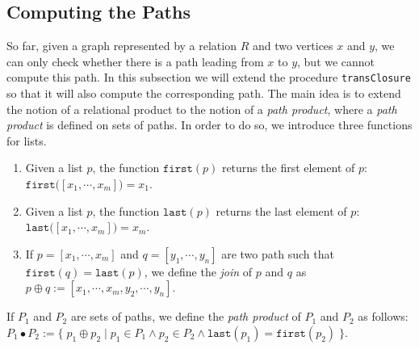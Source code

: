 \subsection{Computing the Paths}
So far, given a graph represented by a relation $R$ and two vertices $x$ and $y$, we can only check
whether there is a path leading from $x$ to $y$, but we cannot compute this path.  In this
subsection we will extend the procedure \texttt{transClosure} so that it will also compute the
corresponding path.  The main idea is to extend the notion of a relational product to the notion of
a \emph{path product}, where a \emph{path product} is defined on sets of paths.  In order to do so,
we introduce three functions for lists.
\begin{enumerate}
\item Given a list $p$, the function $\texttt{first}(p)$ returns the first element of $p$: 
      \\[0.2cm]
      \hspace*{1.3cm}
      $\texttt{first}\bigl([x_1,\cdots,x_m]\bigr) = x_1$.
\item Given a list $p$, the function $\texttt{last}(p)$ returns the last element of $p$: 
      \\[0.2cm]
      \hspace*{1.3cm}
      $\texttt{last}\bigl([x_1,\cdots,x_m]\bigl) = x_m$.
\item If $p = [ x_1, \cdots, x_m ]$ and $q =[ y_1, \cdots, y_n ]$ are two path such that
      $\texttt{first}(q) = \texttt{last}(p)$, we define the \emph{join} of $p$ and $q$ as \\[0.2cm]
      \hspace*{1.3cm}
      $p \oplus q := [x_1, \cdots, x_m, y_2, \cdots, y_n ]$.
\end{enumerate}
If $P_1$ and $P_2$ are sets of paths, we define the  \emph{path product} of
$P_1$ and $P_2$ as follows: \\[0.2cm]
\hspace*{1.3cm} 
$P_1 \bullet P_2 := 
\bigl\{\; p_1 \oplus p_2 \mid p_1 \in P_1 \wedge p_2 \in P_2 \wedge \texttt{last}(p_1) =
\texttt{first}(p_2) \;\bigr\}
$.

